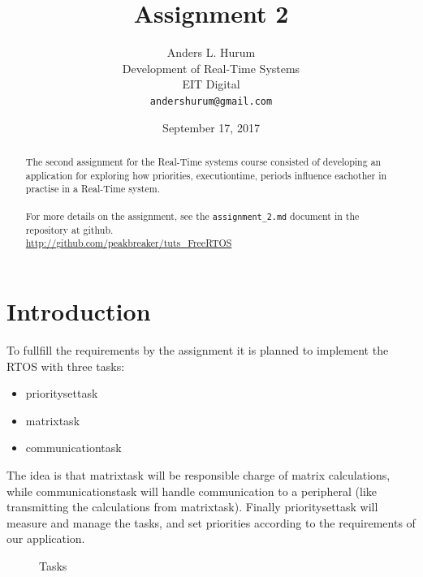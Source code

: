 \documentclass[12pt,fleqn,leqno,letterpaper]{article}
\title{Assignment 2}
\author{Anders L. Hurum\\
    \small{Development of Real-Time Systems}\\
    \small{EIT Digital}\\
    \small{\texttt{andershurum@gmail.com}}
}
\date{September 17, 2017}
\begin{document}
    \maketitle

    \begin{abstract}
        
        The second assignment for the Real-Time systems course consisted of developing 
        an application for exploring how priorities, executiontime, periods influence eachother
        in practise in a Real-Time system. \\ \\
        For more details on the assignment, see the \texttt{assignment\_2.md} document 
        in the repository at github. \\
        
        \url{http://github.com/peakbreaker/tuts\_FreeRTOS}

    \end{abstract}

    \newpage

    \section*{Introduction}
        To fullfill the requirements by the assignment it is planned to implement the RTOS
        with three tasks: 

        \begin{itemize}
            \item prioritysettask
            \item matrixtask
            \item communicationtask 
        \end{itemize} 

        The idea is that matrixtask will be responsible charge of matrix calculations, while 
        communicationstask will handle communication to a peripheral (like transmitting the calculations from matrixtask).
        Finally prioritysettask will measure and manage the tasks, and set priorities according to the requirements
        of our application. \\

        \begin{figure}[h] 
            \centering
            \caption{Tasks}
            \label{figure:tasks}
        \end{figure}
\end{document}
